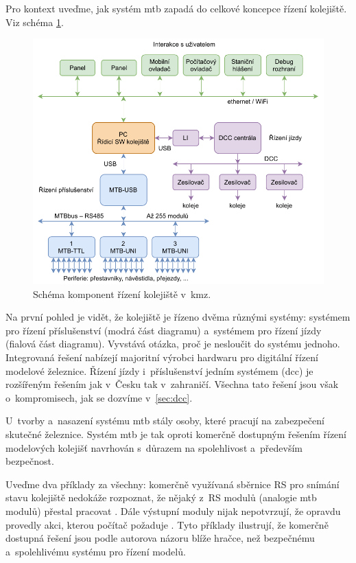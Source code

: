 Pro kontext uveďme, jak systém \gls{mtb} zapadá do celkové koncepce řízení
kolejiště. Viz schéma \ref{fig:control-topology}.

\begin{figure}[ht]
\includegraphics[width=\textwidth]{data/railroad-diagram.pdf}
\caption{Schéma komponent řízení kolejiště v~\gls{kmz}.}
\label{fig:control-topology}
\end{figure}

Na první pohled je vidět, že kolejiště je řízeno dvěma různými systémy:
systémem pro řízení příslušenství (modrá část diagramu) a~systémem pro řízení
jízdy (fialová část diagramu). Vyvstává otázka, proč je nesloučit do systému
jednoho. Integrovaná řešení nabízejí majoritní výrobci hardwaru pro digitální
řízení modelové železnice. Řízení jízdy i~příslušenství jedním systémem (\gls{dcc})
je rozšířeným řešením jak v~Česku tak v~zahraničí. Všechna tato řešení jsou
však o~kompromisech, jak se dozvíme v~\ref{sec:dcc}.

U~tvorby a~nasazení systému \gls{mtb} stály osoby, které pracují na zabezpečení
skutečné železnice. Systém \gls{mtb} je tak oproti komerčně dostupným řešením
řízení modelových kolejišť navrhován s~důrazem na spolehlivost a~především
bezpečnost.

Uveďme dva příklady za všechny: komerčně využívaná sběrnice RS pro snímání
stavu kolejiště nedokáže rozpoznat, že nějaký z~RS modulů (analogie \gls{mtb}
modulů) přestal pracovat \cite{rs:web}. Dále výstupní moduly nijak nepotvrzují,
že opravdu provedly akci, kterou počítač požaduje \cite{dcc_specs:web}. Tyto
příklady ilustrují, že komerčně dostupná řešení jsou podle autorova názoru blíže
hračce, než bezpečnému a~spolehlivému systému pro řízení modelů.

